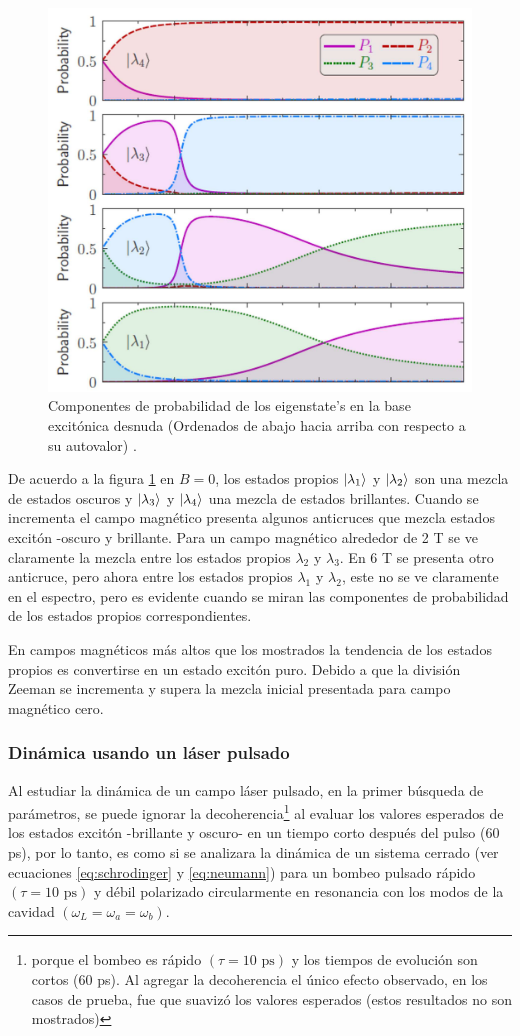 \documentclass[main.tex]{subfiles}
\begin{document}
\begin{figure}[th]
	\centering
	\includegraphics[width=0.7\linewidth]{img/FractionalExcitonMagnetic}
	\caption{Componentes de probabilidad de los eigenstate’s en la base excitónica desnuda (Ordenados de abajo hacia arriba con respecto a su autovalor) \parencite{Jimenez2017}.}
	\label{fig:fractionalexcitonmagnetic}
\end{figure}

De acuerdo a la figura \ref{fig:fractionalexcitonmagnetic} en $B=0$, los estados propios $\ket{\lambda_1}$ y $\ket{\lambda_2}$ son una mezcla de estados oscuros y $\ket{\lambda_3}$ y $\ket{\lambda_4}$ una mezcla de estados brillantes. Cuando se incrementa el campo magnético presenta algunos anticruces que mezcla estados excitón -oscuro y brillante. Para un campo magnético alrededor de 2 T se ve claramente la mezcla entre los estados propios $\lambda_2$ y $\lambda_3$. En 6 T se presenta otro anticruce, pero ahora entre los estados propios $\lambda_1$ y $\lambda_2$, este no se ve claramente en el espectro, pero es evidente cuando se miran las componentes de probabilidad de los estados propios correspondientes.

En campos magnéticos más altos que los mostrados la tendencia de los estados propios es convertirse en un estado excitón puro. Debido a que la división Zeeman se incrementa y supera la mezcla inicial presentada para campo magnético cero.

\subsubsection{Dinámica usando un láser pulsado}
Al estudiar la dinámica de un campo láser pulsado, en la primer búsqueda de parámetros, se puede ignorar la decoherencia\footnote{porque el bombeo es rápido $(\tau=10\text{ ps})$ y los tiempos de evolución son cortos (60 ps). Al agregar la decoherencia el único efecto observado, en los casos de prueba, fue que suavizó los valores esperados (estos resultados no son mostrados)} al evaluar los valores esperados de los estados excitón -brillante y oscuro- en un tiempo corto después del pulso (60 ps), por lo tanto, es como si se analizara la dinámica de un sistema cerrado (ver ecuaciones \ref{eq:schrodinger} y \ref{eq:neumann}) para un bombeo pulsado rápido $(\tau=10\text{ ps})$ y débil polarizado circularmente en resonancia con los modos de la cavidad $(\omega_L = \omega_a = \omega_b)$.
\end{document}
